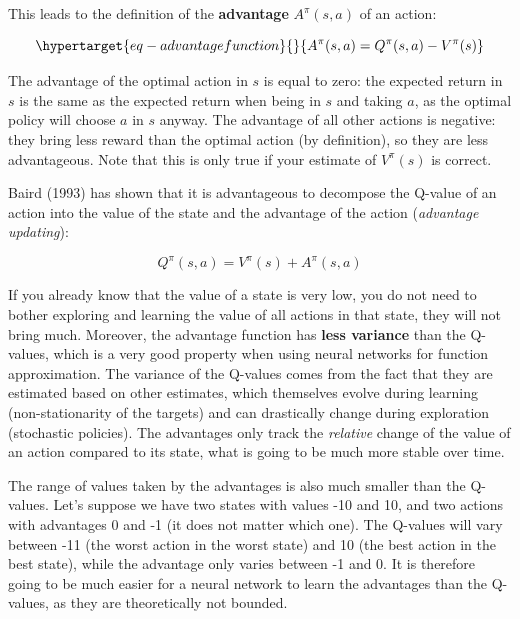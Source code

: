 \documentclass[
  letterpaper,
  DIV=11,
  numbers=noendperiod]{scrreprt}
\begin{document}
This leads to the definition of the \textbf{advantage} \(A^\pi(s,a)\) of
an action:

\begin{equation}\protect\hypertarget{eq-advantagefunction}{}{
    A^\pi(s, a) = Q^\pi(s, a) - V^\pi(s)
}\label{eq-advantagefunction}\end{equation}

The advantage of the optimal action in \(s\) is equal to zero: the
expected return in \(s\) is the same as the expected return when being
in \(s\) and taking \(a\), as the optimal policy will choose \(a\) in
\(s\) anyway. The advantage of all other actions is negative: they bring
less reward than the optimal action (by definition), so they are less
advantageous. Note that this is only true if your estimate of
\(V^\pi(s)\) is correct.

Baird (1993) has shown that it is advantageous to decompose the Q-value
of an action into the value of the state and the advantage of the action
(\emph{advantage updating}):

\[
    Q^\pi(s, a) = V^\pi(s) + A^\pi(s, a)
\]

If you already know that the value of a state is very low, you do not
need to bother exploring and learning the value of all actions in that
state, they will not bring much. Moreover, the advantage function has
\textbf{less variance} than the Q-values, which is a very good property
when using neural networks for function approximation. The variance of
the Q-values comes from the fact that they are estimated based on other
estimates, which themselves evolve during learning (non-stationarity of
the targets) and can drastically change during exploration (stochastic
policies). The advantages only track the \emph{relative} change of the
value of an action compared to its state, what is going to be much more
stable over time.

The range of values taken by the advantages is also much smaller than
the Q-values. Let's suppose we have two states with values -10 and 10,
and two actions with advantages 0 and -1 (it does not matter which one).
The Q-values will vary between -11 (the worst action in the worst state)
and 10 (the best action in the best state), while the advantage only
varies between -1 and 0. It is therefore going to be much easier for a
neural network to learn the advantages than the Q-values, as they are
theoretically not bounded.
\end{document}
